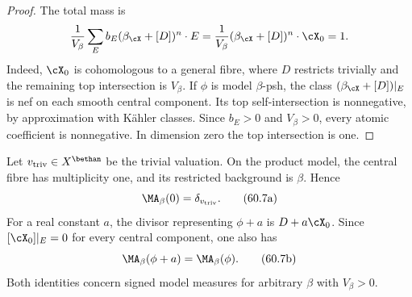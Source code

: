 \begin{proof}
The total mass is
\[
 \frac1{V_\beta}\sum_Eb_E
     (\beta_{\cX}+[D])^n\cdot E
 =\frac1{V_\beta}(\beta_{\cX}+[D])^n\cdot\cX_0=1.
\]
Indeed, $\cX_0$ is cohomologous to a general fibre, where $D$ restricts
trivially and the remaining top intersection is $V_\beta$.
If $\phi$ is model $\beta$-psh, the class
$(\beta_{\cX}+[D])|_E$ is nef on each smooth central component.
Its top self-intersection is nonnegative, by approximation with K\"ahler
classes.  Since $b_E>0$ and $V_\beta>0$, every atomic coefficient is
nonnegative.  In dimension zero the top intersection is one.
\end{proof}

Let $v_{\mathrm{triv}}\in X^{\bethan}$ be the trivial valuation. On the product model, the central fibre has multiplicity one, and its restricted background is $\beta$. Hence
\[
 \MA_\beta(0)=\delta_{v_{\mathrm{triv}}}.
\tag{60.7a}\label{eq:mp-ma-zero}
\]
For a real constant $a$, the divisor representing $\phi+a$ is $D+a\cX_0$. Since $[\cX_0]|_E=0$ for every central component, one also has
\[
 \MA_\beta(\phi+a)=\MA_\beta(\phi).
\tag{60.7b}\label{eq:mp-ma-translation}
\]
Both identities concern signed model measures for arbitrary $\beta$ with $V_\beta>0$.


